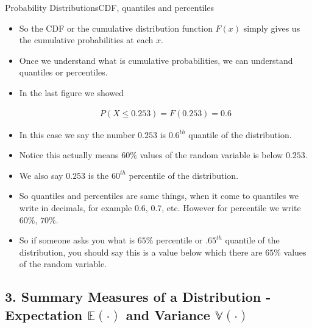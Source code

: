 \documentclass[8pt, usepdftitle = false]{beamer}
\begin{document}
\begin{frame}[allowframebreaks]{Probability Distributions}{CDF, quantiles and percentiles}
\begin{itemize}
\item So the CDF or the cumulative distribution function $F(x)$ simply gives us the cumulative probabilities at each $x$.


\item  Once we understand what is cumulative probabilities, we can understand \alert{quantiles} or \alert{percentiles}.

\item In the last figure we showed


\begin{align*}
P ( X \leq 0.253) = F(0.253) = 0.6
\end{align*}

\item In this case we say the number $0.253$ is $0.6^{th}$ \alert{quantile} of the distribution. 

\item Notice this actually means $60\%$ values of the random variable is below $0.253$.

\item We also say $0.253$ is the $60^{th}$ \alert{percentile} of the distribution.

\item So quantiles and percentiles are same things, when it come to quantiles we write in decimals, for example $0.6$, $0.7$, etc. However for percentile we write $60\%$, $70\%$.

\item So if someone asks you what is $65\%$ percentile or $.65^{th}$ quantile of the distribution, you should say this is a value below which there are $65\%$ values of the random variable.




\end{itemize}
\end{frame}


\subsection{3. Summary Measures of a Distribution - Expectation $\mathbb{E}(\cdot)$ and Variance $\mathbb{V}(\cdot)$}

\frame{\subsectionpage}
\end{document}
